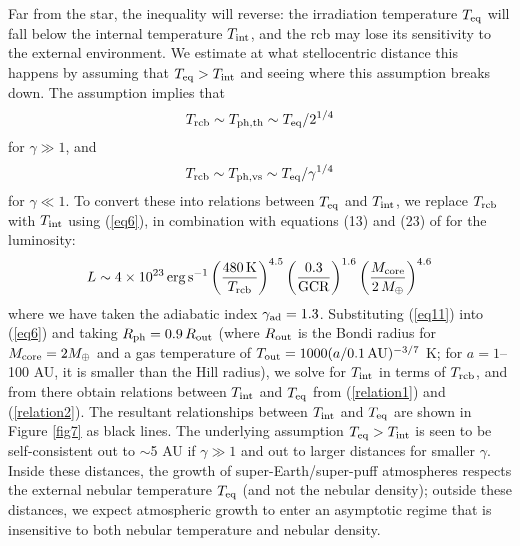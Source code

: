 \documentclass[fleqn,useAMS,usenatbib]{mnras}
\begin{document}
Far from the star, the inequality will reverse: the
irradiation temperature $T_{\rm eq}$
will fall below the internal temperature $T_{\rm int}$,
and the rcb may lose its sensitivity to the external environment.
We estimate at what stellocentric distance this happens by
assuming that $T_{\rm eq} > T_{\rm int}$ and seeing where this
assumption breaks down. The assumption implies that
\begin{equation} \label{relation1}
T_{\rm rcb} \sim T_{\rm ph,th} \sim T_{\rm eq}/2^{1/4}
\end{equation}
for $\gamma \gg 1$, and
\begin{equation} \label{relation2}
T_{\rm rcb} \sim T_{\rm ph,vs} \sim T_{\rm eq}/\gamma^{1/4}
\end{equation}
for $\gamma \ll 1$. To convert these into relations
between $T_{\rm eq}$ and $T_{\rm int}$, we replace
$T_{\rm rcb}$ with $T_{\rm int}$ using (\ref{eq6}),
in combination with 
equations (13) and (23) of \citet{paper2} for the
luminosity:
\begin{equation} 
    L \sim 4\times 10^{23}\,{\rm erg\,s^{-1}}\left(\frac{480\,{\rm K}}{T_{\rm rcb}}\right)^{4.5}\left(\frac{0.3}{{\rm GCR}}\right)^{1.6}\left(\frac{M_{\rm core}}{2\,M_\oplus}\right)^{4.6}
    \label{eq11}
\end{equation}
%
where we have taken 
the adiabatic index $\gamma_{\rm ad} = 1.3$.
Substituting (\ref{eq11}) into (\ref{eq6}) and
taking $R_{\rm ph} = 0.9\,R_{\rm out}$
(where $R_{\rm out}$ is the Bondi radius
for $M_{\rm core} = 2 M_\oplus$ and a gas temperature
of $T_{\rm out} = 1000 (a/0.1 \, {\rm AU})^{-3/7}$ K;
for $a=1$--100 AU, it is smaller than the Hill radius),
we solve for $T_{\rm int}$
in terms of $T_{\rm rcb}$, and from there obtain
relations between $T_{\rm int}$ and $T_{\rm eq}$
from (\ref{relation1}) and (\ref{relation2}). 
The resultant relationships between $T_{\rm int}$ and $T_{\rm eq}$ 
are shown in Figure \ref{fig7} as black lines.
The underlying assumption $T_{\rm eq} > T_{\rm int}$
is seen to be self-consistent out to $\sim$5 AU if $\gamma \gg 1$
and out to larger distances for smaller $\gamma$.
Inside these distances, the growth of super-Earth/super-puff
atmospheres respects the external nebular temperature $T_{\rm eq}$
(and not the nebular density);
outside these distances, we expect atmospheric growth to enter
an asymptotic regime that is insensitive to both nebular temperature
and nebular density.
\end{document}
